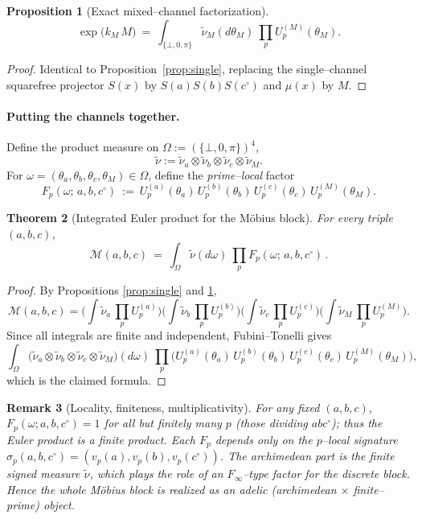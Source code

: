 \documentclass[12pt]{article}
\newtheorem{theorem}{Theorem}[section]
\newtheorem{proposition}[theorem]{Proposition}
\newtheorem{remark}[theorem]{Remark}
\numberwithin{equation}{section}
\begin{document}
\begin{proposition}[Exact mixed–channel factorization]\label{prop:mixed}
\[
\exp\!\big(k_M\,M\big)\ =\ \int_{\{\bot,0,\pi\}}\tilde\nu_M(d\theta_M)\ \prod_{p} U^{(M)}_p(\theta_M).
\]
\end{proposition}

\begin{proof}
Identical to Proposition~\ref{prop:single}, replacing the single–channel squarefree projector $S(x)$ by $S(a)S(b)S(c^\circ)$ and $\mu(x)$ by $M$.
\end{proof}

\paragraph{Putting the channels together.}
Define the product measure on $\Omega:=(\{\bot,0,\pi\})^{4}$,
\[
\tilde\nu:=\tilde\nu_a\otimes \tilde\nu_b\otimes \tilde\nu_c\otimes \tilde\nu_M .
\]
For $\omega=(\theta_a,\theta_b,\theta_c,\theta_M)\in\Omega$, define the \emph{prime–local} factor
\[
F_p(\omega;\,a,b,c^\circ)\ :=\ U^{(a)}_p(\theta_a)\,U^{(b)}_p(\theta_b)\,U^{(c)}_p(\theta_c)\,U^{(M)}_p(\theta_M).
\]

\begin{theorem}[Integrated Euler product for the Möbius block]\label{thm:Euler}
For every triple $(a,b,c)$,
\[
\boxed{\quad
\mathcal{M}(a,b,c)\ =\ \int_{\Omega}\tilde\nu(d\omega)\ \prod_{p} F_p(\omega;\,a,b,c^\circ)\,.
\quad}
\]
\end{theorem}

\begin{proof}
By Propositions \ref{prop:single} and \ref{prop:mixed},
\[
\mathcal{M}(a,b,c)
=\Big(\int\tilde\nu_a\,\prod_p U^{(a)}_p\Big)
 \Big(\int\tilde\nu_b\,\prod_p U^{(b)}_p\Big)
 \Big(\int\tilde\nu_c\,\prod_p U^{(c)}_p\Big)
 \Big(\int\tilde\nu_M\,\prod_p U^{(M)}_p\Big).
\]
Since all integrals are finite and independent, Fubini–Tonelli gives
\[
\int_{\Omega}\big(\tilde\nu_a\otimes\tilde\nu_b\otimes\tilde\nu_c\otimes\tilde\nu_M\big)(d\omega)\ 
\prod_{p}\Big(U^{(a)}_p(\theta_a)\,U^{(b)}_p(\theta_b)\,U^{(c)}_p(\theta_c)\,U^{(M)}_p(\theta_M)\Big),
\]
which is the claimed formula.
\end{proof}

\begin{remark}[Locality, finiteness, multiplicativity]
For any fixed $(a,b,c)$, $F_p(\omega; a,b,c^\circ)=1$ for all but finitely many $p$ (those dividing $abc^\circ$); thus the Euler product is a \emph{finite} product. Each $F_p$ depends \emph{only} on the $p$–local signature $\sigma_p(a,b,c^\circ)=(v_p(a),v_p(b),v_p(c^\circ))$. The archimedean part is the finite signed measure $\tilde\nu$, which plays the role of an $F_\infty$–type factor for the discrete block. Hence the whole Möbius block is realized as an \emph{adelic} (archimedean $\times$ finite–prime) object.
\end{remark}
\end{document}
